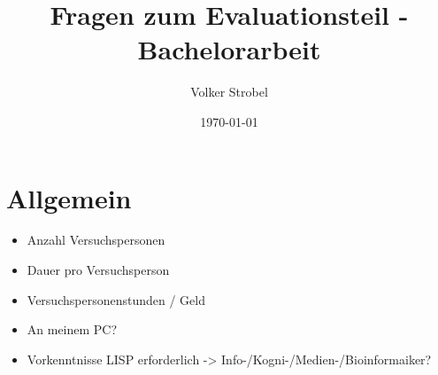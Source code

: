 \documentclass[11pt]{article}
\author{Volker Strobel}
\date{\today}
\title{Fragen zum Evaluationsteil - Bachelorarbeit}
\begin{document}
\maketitle
\tableofcontents

\section{Allgemein}
\label{sec-1}
\begin{itemize}
\item Anzahl Versuchspersonen
\item Dauer pro Versuchsperson
\item Versuchspersonenstunden / Geld
\item An meinem PC?
\item Vorkenntnisse LISP erforderlich ->
Info-/Kogni-/Medien-/Bioinformaiker?
\end{itemize}
\end{document}

